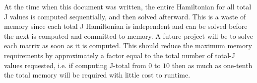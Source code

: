 At the time when this document was written, the entire Hamiltonian for all total
J values is computed sequentially, and then solved afterward. This is a waste of 
memory since each total J Hamiltonian is independent and can be solved before the
next is computed and committed to memory. A future project will be to solve
each matrix as soon as it is computed. This should reduce the maximum memory requirements
by approximately a factor equal to the total number of total-J values requested,
i.e. if computing J-total from $0$ to $10$ then as much as one-tenth the total 
memory will be required with little cost to runtime.


